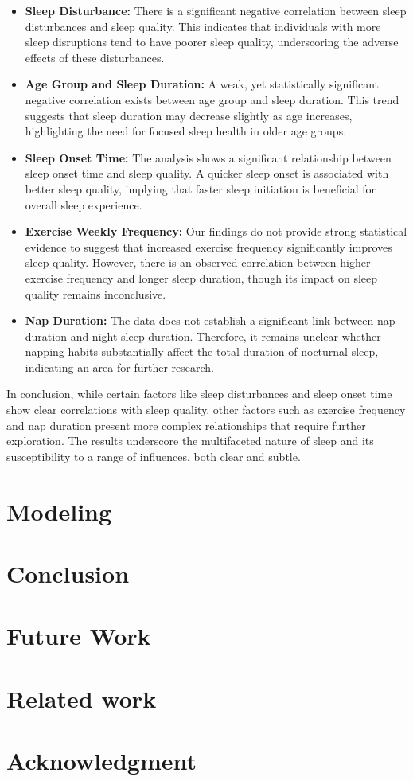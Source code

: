 \documentclass[conference]{IEEEtran}
\begin{document}
\begin{itemize}
    \item \textbf{Sleep Disturbance:} There is a significant negative correlation between sleep disturbances and sleep quality. This indicates that individuals with more sleep disruptions tend to have poorer sleep quality, underscoring the adverse effects of these disturbances.
    \item \textbf{Age Group and Sleep Duration:} A weak, yet statistically significant negative correlation exists between age group and sleep duration. This trend suggests that sleep duration may decrease slightly as age increases, highlighting the need for focused sleep health in older age groups.
    \item \textbf{Sleep Onset Time:} The analysis shows a significant relationship between sleep onset time and sleep quality. A quicker sleep onset is associated with better sleep quality, implying that faster sleep initiation is beneficial for overall sleep experience.
    \item \textbf{Exercise Weekly Frequency:} Our findings do not provide strong statistical evidence to suggest that increased exercise frequency significantly improves sleep quality. However, there is an observed correlation between higher exercise frequency and longer sleep duration, though its impact on sleep quality remains inconclusive.
    \item \textbf{Nap Duration:} The data does not establish a significant link between nap duration and night sleep duration. Therefore, it remains unclear whether napping habits substantially affect the total duration of nocturnal sleep, indicating an area for further research.
\end{itemize}

In conclusion, while certain factors like sleep disturbances and sleep onset time show clear correlations with sleep quality, other factors such as exercise frequency and nap duration present more complex relationships that require further exploration. The results underscore the multifaceted nature of sleep and its susceptibility to a range of influences, both clear and subtle.


\section{Modeling}
\section{Conclusion}
\section{Future Work}


\section{Related work}
\section*{Acknowledgment}


\end{document}
